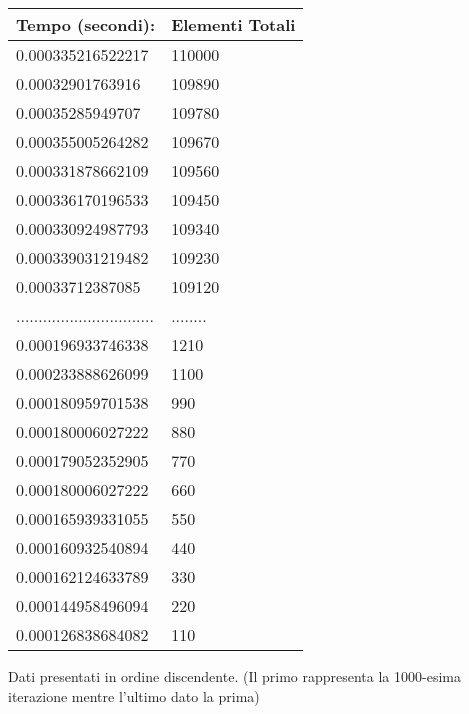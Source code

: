
\begin{tabular}{|p{}|p{}|}
\hline
Tempo (secondi):&Elementi Totali\\	
\hline
 0.000335216522217 &110000 \\
0.00032901763916 &109890\\
0.00035285949707 &109780\\
0.000355005264282 &109670\\
0.000331878662109 &109560\\
0.000336170196533 &109450\\
0.000330924987793 &109340\\
0.000339031219482 &109230\\
0.00033712387085 &109120\\
............................... & ........\\
0.000196933746338 &1210\\
0.000233888626099 &1100\\
0.000180959701538 &990\\
0.000180006027222 &880\\
0.000179052352905 &770\\
0.000180006027222 &660\\
0.000165939331055 &550\\
0.000160932540894 &440\\
0.000162124633789 &330\\
0.000144958496094 &220\\
0.000126838684082 &110\\
\hline
\end{tabular}
\caption{Dati presentati in ordine discendente. (Il primo rappresenta la 1000-esima iterazione mentre l'ultimo dato la prima)}\label{wrap-tab:1}
